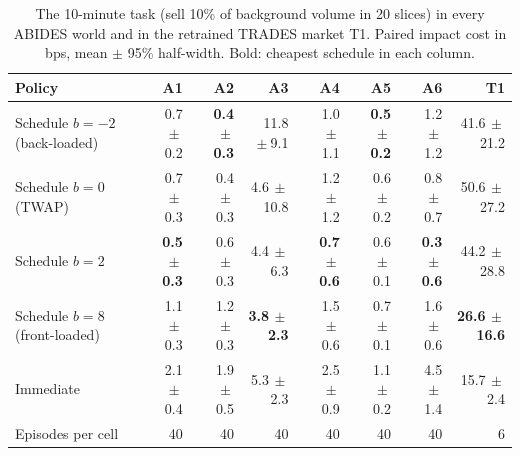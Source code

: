 \begin{table}[!htbp]
\centering\footnotesize
\caption{The 10-minute task (sell 10\% of background volume in 20 slices) in every ABIDES world and in the retrained TRADES market T1. Paired impact cost in bps, mean $\pm$ 95\% half-width. Bold: cheapest schedule in each column.}\label{tab:short}
\begin{tabular}{lrrrrrrr}
\toprule
Policy & A1 & A2 & A3 & A4 & A5 & A6 & T1 \\
\midrule
Schedule $b=-2$ (back-loaded) & 0.7{\tiny$\,\pm$0.2} & \textbf{0.4{\tiny$\,\pm$0.3}} & 11.8{\tiny$\,\pm$9.1} & 1.0{\tiny$\,\pm$1.1} & \textbf{0.5{\tiny$\,\pm$0.2}} & 1.2{\tiny$\,\pm$1.2} & 41.6{\tiny$\,\pm$21.2} \\
Schedule $b=0$ (TWAP) & 0.7{\tiny$\,\pm$0.3} & 0.4{\tiny$\,\pm$0.3} & 4.6{\tiny$\,\pm$10.8} & 1.2{\tiny$\,\pm$1.2} & 0.6{\tiny$\,\pm$0.2} & 0.8{\tiny$\,\pm$0.7} & 50.6{\tiny$\,\pm$27.2} \\
Schedule $b=2$ & \textbf{0.5{\tiny$\,\pm$0.3}} & 0.6{\tiny$\,\pm$0.3} & 4.4{\tiny$\,\pm$6.3} & \textbf{0.7{\tiny$\,\pm$0.6}} & 0.6{\tiny$\,\pm$0.1} & \textbf{0.3{\tiny$\,\pm$0.6}} & 44.2{\tiny$\,\pm$28.8} \\
Schedule $b=8$ (front-loaded) & 1.1{\tiny$\,\pm$0.3} & 1.2{\tiny$\,\pm$0.3} & \textbf{3.8{\tiny$\,\pm$2.3}} & 1.5{\tiny$\,\pm$0.6} & 0.7{\tiny$\,\pm$0.1} & 1.6{\tiny$\,\pm$0.6} & \textbf{26.6{\tiny$\,\pm$16.6}} \\
Immediate & 2.1{\tiny$\,\pm$0.4} & 1.9{\tiny$\,\pm$0.5} & 5.3{\tiny$\,\pm$2.3} & 2.5{\tiny$\,\pm$0.9} & 1.1{\tiny$\,\pm$0.2} & 4.5{\tiny$\,\pm$1.4} & 15.7{\tiny$\,\pm$2.4} \\
\midrule
Episodes per cell & 40 & 40 & 40 & 40 & 40 & 40 & 6 \\
\bottomrule
\end{tabular}
\end{table}
